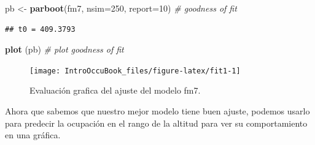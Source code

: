 \documentclass[
]{book}
\newenvironment{Shaded}{\begin{snugshade}}{\end{snugshade}}
\newcommand{\CommentTok}[1]{\textcolor[rgb]{0.56,0.35,0.01}{\textit{#1}}}
\newcommand{\DataTypeTok}[1]{\textcolor[rgb]{0.13,0.29,0.53}{#1}}
\newcommand{\DecValTok}[1]{\textcolor[rgb]{0.00,0.00,0.81}{#1}}
\newcommand{\FloatTok}[1]{\textcolor[rgb]{0.00,0.00,0.81}{#1}}
\newcommand{\KeywordTok}[1]{\textcolor[rgb]{0.13,0.29,0.53}{\textbf{#1}}}
\newcommand{\NormalTok}[1]{#1}
\newcommand{\OperatorTok}[1]{\textcolor[rgb]{0.81,0.36,0.00}{\textbf{#1}}}
\newcommand{\OtherTok}[1]{\textcolor[rgb]{0.56,0.35,0.01}{#1}}
\newcommand{\StringTok}[1]{\textcolor[rgb]{0.31,0.60,0.02}{#1}}
\begin{document}
\begin{Shaded}
\begin{Highlighting}[]
\NormalTok{pb <-}\StringTok{ }\KeywordTok{parboot}\NormalTok{(fm7, }\DataTypeTok{nsim=}\DecValTok{250}\NormalTok{, }\DataTypeTok{report=}\DecValTok{10}\NormalTok{) }\CommentTok{# goodness of fit}
\end{Highlighting}
\end{Shaded}

\begin{verbatim}
## t0 = 409.3793
\end{verbatim}

\begin{Shaded}
\begin{Highlighting}[]
\KeywordTok{plot}\NormalTok{ (pb) }\CommentTok{# plot goodness of fit}
\end{Highlighting}
\end{Shaded}

\begin{figure}
\texttt{[image: IntroOccuBook\_files/figure-latex/fit1-1]} \caption[fig]{Evaluación grafica del ajuste del modelo fm7.}\label{fig:fit1}
\end{figure}

Ahora que sabemos que nuestro mejor modelo tiene buen ajuste, podemos usarlo para predecir la ocupación en el rango de la altitud para ver su comportamiento en una gráfica.

\begin{Shaded}
\end{Shaded}
\end{document}
